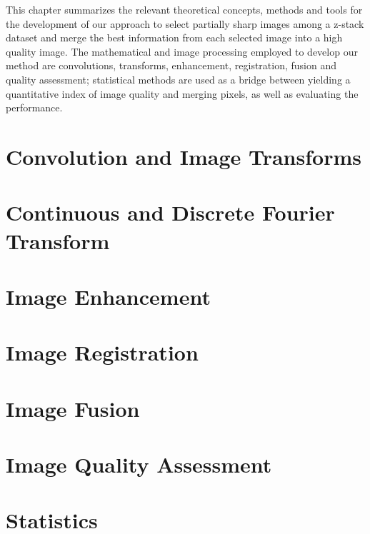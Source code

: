 
This chapter summarizes the relevant theoretical concepts, methods and tools for the development of our approach to select partially sharp images among a z-stack dataset and merge the best information from each selected image into a high quality image. The mathematical and image processing employed to develop our method are convolutions, transforms, enhancement, registration, fusion and quality assessment; statistical methods are used as a bridge between yielding a quantitative index of image quality and merging pixels, as well as evaluating the performance.


\section{Convolution and Image Transforms}


\section{Continuous and Discrete Fourier Transform}


\section{Image Enhancement}


\section{Image Registration}


\section{Image Fusion}


\section{Image Quality Assessment}


\section{Statistics}
